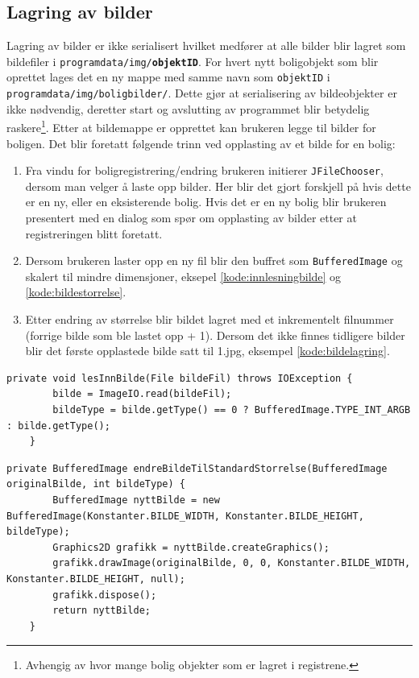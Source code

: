 \subsection{Lagring av bilder}
Lagring av bilder er ikke serialisert hvilket medfører at alle bilder blir lagret som bildefiler i \texttt{programdata/img/\textbf{objektID}}. For hvert nytt boligobjekt som blir oprettet lages det en ny mappe med samme navn som \texttt{objektID} i \texttt{programdata/img/boligbilder/}. Dette gjør at serialisering av bildeobjekter er ikke nødvendig, deretter start og avslutting av programmet blir betydelig raskere\footnote{Avhengig av hvor mange bolig objekter som er lagret i registrene.}. Etter at bildemappe er opprettet kan brukeren legge til bilder for boligen. Det blir foretatt følgende trinn ved opplasting av et bilde for en bolig:
\begin{enumerate}

\item Fra vindu for boligregistrering/endring brukeren initierer \texttt{JFileChooser}, dersom man velger å laste opp bilder. Her blir det gjort forskjell på hvis dette er en ny, eller en eksisterende bolig. Hvis det er en ny bolig blir brukeren presentert med en dialog som spør om opplasting av bilder etter at registreringen blitt foretatt.

\item Dersom brukeren laster opp en ny fil blir den buffret som \texttt{BufferedImage} og skalert til mindre dimensjoner, eksepel \ref{kode:innlesningbilde} og \ref{kode:bildestorrelse}.

\item Etter endring av størrelse blir bildet lagret med et inkrementelt filnummer (forrige bilde som ble lastet opp + 1). Dersom det ikke finnes tidligere bilder blir det første opplastede bilde satt til 1.jpg, eksempel \ref{kode:bildelagring}.

\end{enumerate}

\begin{lstlisting}[caption=BoligBilde.java: Innlesning av bildefil, label=kode:innlesningbilde]
	private void lesInnBilde(File bildeFil) throws IOException {
        bilde = ImageIO.read(bildeFil);
        bildeType = bilde.getType() == 0 ? BufferedImage.TYPE_INT_ARGB : bilde.getType();
    }
\end{lstlisting}

\begin{lstlisting}[caption=BoligBilde.java: Endring av opplastet bildestørrelse, label=kode:bildestorrelse]
	private BufferedImage endreBildeTilStandardStorrelse(BufferedImage originalBilde, int bildeType) {
        BufferedImage nyttBilde = new BufferedImage(Konstanter.BILDE_WIDTH, Konstanter.BILDE_HEIGHT, bildeType);
        Graphics2D grafikk = nyttBilde.createGraphics();
        grafikk.drawImage(originalBilde, 0, 0, Konstanter.BILDE_WIDTH, Konstanter.BILDE_HEIGHT, null);
        grafikk.dispose();
        return nyttBilde;
    }
\end{lstlisting}


